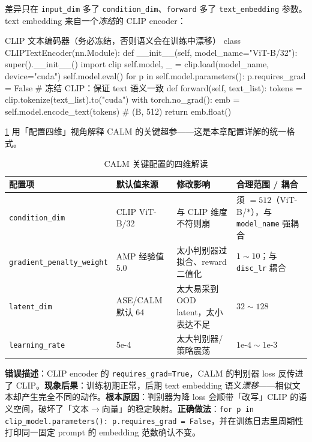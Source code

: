 差异只在 \verb|input_dim| 多了 \verb|condition_dim|、\verb|forward| 多了 \verb|text_embedding| 参数。text embedding 来自一个\emph{冻结}的 CLIP encoder：

\begin{codebox}[Python]{CLIP 文本编码器（务必冻结，否则语义会在训练中漂移）}
class CLIPTextEncoder(nn.Module):
    def __init__(self, model_name="ViT-B/32"):
        super().__init__()
        import clip
        self.model, _ = clip.load(model_name, device="cuda")
        self.model.eval()
        for p in self.model.parameters():
            p.requires_grad = False           # 冻结 CLIP：保证 text 语义一致
    def forward(self, text_list):
        tokens = clip.tokenize(text_list).to("cuda")
        with torch.no_grad():
            emb = self.model.encode_text(tokens)   # (B, 512)
        return emb.float()
\end{codebox}

\cref{tab:rlmc-mm-calm-config} 用「配置四维」视角解释 CALM 的关键超参——这是本章配置详解的统一格式。

\begin{table}[ht]
\centering
\small
\caption{CALM 关键配置的四维解读}
\label{tab:rlmc-mm-calm-config}
\begin{tabular}{@{}lp{2.6cm}p{3.0cm}p{3.4cm}@{}}
\toprule
配置项 & 默认值来源 & 修改影响 & 合理范围 / 耦合 \\
\midrule
\texttt{condition\_dim} & CLIP ViT-B/32 & 与 CLIP 维度不符则崩 & 须 $=512$（ViT-B/$\ast$），与 \texttt{model\_name} 强耦合 \\
\texttt{gradient\_penalty\_weight} & AMP 经验值 5.0 & 太小判别器过拟合、reward 二值化 & $1\sim10$；与 \texttt{disc\_lr} 耦合 \\
\texttt{latent\_dim} & ASE/CALM 默认 64 & 太大易采到 OOD latent，太小表达不足 & $32\sim128$ \\
\texttt{learning\_rate} & 5e-4 & 太大判别器/策略震荡 & $1\text{e-}4\sim 1\text{e-}3$ \\
\bottomrule
\end{tabular}
\end{table}

\begin{pitfall}
\textbf{错误描述}：CLIP encoder 的 \verb|requires_grad=True|，CALM 的判别器 loss 反传进了 CLIP。\textbf{现象后果}：训练初期正常，后期 text embedding 语义\emph{漂移}——相似文本却产生完全不同的动作。\textbf{根本原因}：判别器为降 loss 会顺带「改写」CLIP 的语义空间，破坏了「文本$\to$向量」的稳定映射。\textbf{正确做法}：\verb|for p in clip_model.parameters(): p.requires_grad = False|，并在训练日志里周期性打印同一固定 prompt 的 embedding 范数确认不变。
\end{pitfall}


